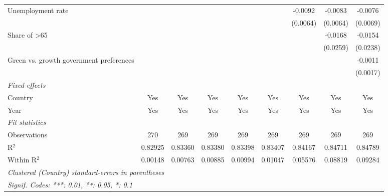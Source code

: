 \begin{table}[htbp]
\begin{tabular}{lcccccccc}
      Unemployment rate                                                  &          &          &          &          &          & -0.0092  & -0.0083  & -0.0076\\   
                                                                         &          &          &          &          &          & (0.0064) & (0.0064) & (0.0069)\\   
      Share of >65                                                       &          &          &          &          &          &          & -0.0168  & -0.0154\\   
                                                                         &          &          &          &          &          &          & (0.0259) & (0.0238)\\   
      Green vs. growth government preferences                            &          &          &          &          &          &          &          & -0.0011\\   
                                                                         &          &          &          &          &          &          &          & (0.0017)\\   
      \midrule
      \emph{Fixed-effects}\\
      Country                                                            & Yes      & Yes      & Yes      & Yes      & Yes      & Yes      & Yes      & Yes\\  
      Year                                                               & Yes      & Yes      & Yes      & Yes      & Yes      & Yes      & Yes      & Yes\\  
      \midrule
      \emph{Fit statistics}\\
      Observations                                                       & 270      & 269      & 269      & 269      & 269      & 269      & 269      & 269\\  
      R$^2$                                                              & 0.82925  & 0.83360  & 0.83380  & 0.83398  & 0.83407  & 0.84167  & 0.84711  & 0.84789\\  
      Within R$^2$                                                       & 0.00148  & 0.00763  & 0.00885  & 0.00994  & 0.01047  & 0.05576  & 0.08819  & 0.09284\\  
      \midrule \midrule
      \multicolumn{9}{l}{\emph{Clustered (Country) standard-errors in parentheses}}\\
      \multicolumn{9}{l}{\emph{Signif. Codes: ***: 0.01, **: 0.05, *: 0.1}}\\
   \end{tabular}
\end{table}


